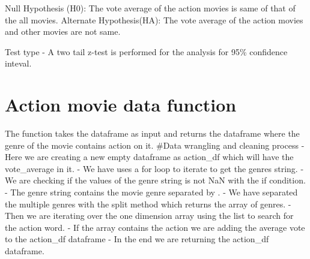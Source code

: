 \documentclass[11pt]{article}
\begin{document}
Null Hypothesis (H0): The vote average of the action movies is same of
that of the all movies. Alternate Hypothesis(HA): The vote average of
the action movies and other movies are not same.

Test type - A two tail z-test is performed for the analysis for 95\%
confidence inteval.

    \section{Action movie data function}\label{action-movie-data-function}

The function takes the dataframe as input and returns the dataframe
where the genre of the movie contains action on it. \#Data wrangling and
cleaning process - Here we are creating a new empty dataframe as
action\_df which will have the vote\_average in it. - We have uses a for
loop to iterate to get the genres string. - We are checking if the
values of the genre string is not NaN with the if condition. - The genre
string contains the movie genre separated by \textbar{}. - We have
separated the multiple genres with the split method which returns the
array of genres. - Then we are iterating over the one dimension array
using the list to search for the action word. - If the array contains
the action we are adding the average vote to the action\_df dataframe -
In the end we are returning the action\_df dataframe.
\end{document}
